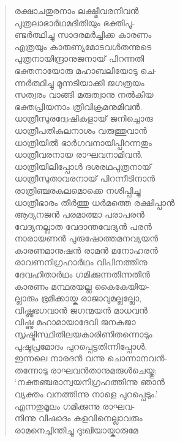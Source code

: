 \begin{verse}
രക്ഷാചതുരനാം ലക്ഷ്മീവരനിവന്‍\\
പുത്രലാഭാര്‍ഥമദിതിയും ഭക്തിപൂ-\\
ണ്ടര്‍ത്ഥിച്ചു സാദരമര്‍ച്ചിക്ക കാരണം\\
എത്രയും കാരുണ്യമോടവള്‍തന്നുടെ\\
പുത്രനായിന്ദ്രാനുജനായ് പിറന്നതി\\
ഭക്തനായോരു മഹാബലിയോടു ചെ-\\
ന്നര്‍ത്ഥിച്ചു മൂന്നടിയാക്കി ജഗത്രയം\\
സത്വരം വാങ്ങി മരുത്വാനു നല്‍കിയ\\
ഭക്തപ്രിയനാം ത്രിവിക്രമനുമിവന്‍.\\
ധാത്രീസുരദ്വേഷികളായ് ജനിച്ചൊരു\\
ധാത്രീപതികുലനാശം വരുത്തുവാന്‍\\
ധാത്രിയില്‍ ഭാര്‍ഗവനായിപ്പിറന്നതും\\
ധാത്രീവരനായ രാഘവനാമിവന്‍.\\
ധാത്രിയിലിപ്പോള്‍ ദശരഥപുത്രനായ്\\
ധാത്രീസുതാവരനായ് പിറന്നീടിനാന്‍\\
രാത്രിഞ്ചരകുലമൊക്കെ നശിപ്പിച്ചു\\
ധാത്രീഭാരം തീര്‍ത്തു ധര്‍മത്തെ രക്ഷിപ്പാന്‍\\
ആദ്യനജന്‍ പരമാത്മാ പരാപരന്‍\\
വേദ്യനല്ലാത വേദാന്തവേദ്യന്‍ പരന്‍\\
നാരായണന്‍ പുരുഷോത്തമനവ്യയന്‍\\
കാരണമാനുഷന്‍ രാമന്‍ മനോഹരന്‍\\
രാവണനിഗ്രഹാര്‍ഥം വിപിനത്തിനു\\
ദേവഹിതാര്‍ഥം ഗമിക്കുന്നതിന്നതിന്‍\\
കാരണം മന്ഥരയല്ല കൈകേയിയ-\\
ല്ലാരും ഭ്രമിക്കായ്ക രാജാവുമല്ലല്ലോ,\\
വിഷ്ണുഭഗവാന്‍ ജഗന്മയന്‍ മാധവന്‍\\
വിഷ്ണു മഹാമായാദേവി ജനകജാ\\
സൃഷ്ടിസ്ഥിതിലയകാരിണിതന്നൊടും\\
പുഷ്ടപ്രമോദം പുറപ്പെട്ടതിന്നിപ്പോള്‍.\\
ഇന്നലെ നാരദന്‍ വന്നു ചൊന്നാനവന്‍-\\
തന്നോടു രാഘവന്‍താനുമരുള്‍ചെയ്തു:\\
‘നക്തഞ്ചരാന്വയനിഗ്രഹത്തിന്നു ഞാന്‍\\
വ്യക്തം വനത്തിന്നു നാളെ പുറപ്പെടും.’\\
എന്നതുമൂലം ഗമിക്കുന്നു രാഘവ-\\
നിന്നു വിഷാദം കളവിനെല്ലാവരും\\
രാമനെച്ചിന്തിച്ചു ദുഃഖിയായ്കാരുമേ\\

\end{verse}
